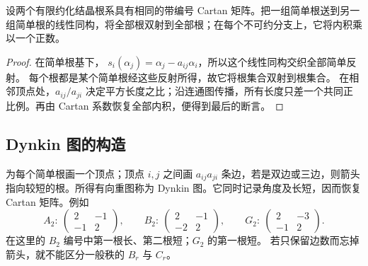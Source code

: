 \begin{proposition}\label{b5:prop:cartan-determines-roots}
	设两个有限约化结晶根系具有相同的带编号 Cartan 矩阵。把一组简单根送到另一组简单根的线性同构，将全部根双射到全部根；在每个不可约分支上，它将内积乘以一个正数。
\end{proposition}
\begin{proof}
	在简单根基下， \(s_i(\alpha_j)=\alpha_j-a_{ij}\alpha_i\)，所以这个线性同构交织全部简单反射。 每个根都是某个简单根经这些反射所得，故它将根集合双射到根集合。 在相邻顶点处，\(a_{ij}/a_{ji}\) 决定平方长度之比；沿连通图传播，所有长度只差一个共同正比例。再由 Cartan 系数恢复全部内积，便得到最后的断言。
\end{proof}

\subsection{Dynkin 图的构造}
\label{b5:subsec:1702:03}

为每个简单根画一个顶点；顶点 \(i,j\) 之间画 \(a_{ij}a_{ji}\) 条边，若是双边或三边，则箭头指向较短的根。所得有向重图称为 Dynkin 图。它同时记录角度及长短，因而恢复 Cartan 矩阵。例如
\[
	A_2:\ \begin{pmatrix}2&-1\\-1&2\end{pmatrix},\qquad
	B_2:\ \begin{pmatrix}2&-1\\-2&2\end{pmatrix},\qquad
	G_2:\ \begin{pmatrix}2&-3\\-1&2\end{pmatrix}.
\]
在这里的 \(B_2\) 编号中第一根长、第二根短；\(G_2\) 的第一根短。 若只保留边数而忘掉箭头，就不能区分一般秩的 \(B_r\) 与 \(C_r\)。


